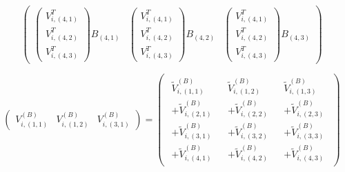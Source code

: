 $$\begin{pmatrix}
		\begin{pmatrix} V_{i,(4,1)}^T \\ V_{i,(4,2)}^T \\ V_{i,(4,3)}^T \end{pmatrix} B_{(4,1)} & \begin{pmatrix} V_{i,(4,1)}^T \\ V_{i,(4,2)}^T \\ V_{i,(4,3)}^T \end{pmatrix} B_{(4,2)} & \begin{pmatrix} V_{i,(4,1)}^T \\ V_{i,(4,2)}^T \\ V_{i,(4,3)}^T \end{pmatrix} B_{(4,3)}
	\end{pmatrix}
$$

$$
	\begin{pmatrix}
		V_{i,(1,1)}^{(B)} & V_{i,(1,2)}^{(B)} & V_{i,(3,1)}^{(B)}
	\end{pmatrix}
	=
	\begin{pmatrix}
		\begin{array}{c} \widetilde{V}_{i,(1,1)}^{(B)} \\ + \widetilde{V}_{i,(2,1)}^{(B)} \\ + \widetilde{V}_{i,(3,1)}^{(B)} \\ + \widetilde{V}_{i,(4,1)}^{(B)} \end{array} & \begin{array}{c} \widetilde{V}_{i,(1,2)}^{(B)} \\ + \widetilde{V}_{i,(2,2)}^{(B)} \\ + \widetilde{V}_{i,(3,2)}^{(B)} \\ + \widetilde{V}_{i,(4,2)}^{(B)} \end{array} & \begin{array}{c} \widetilde{V}_{i,(1,3)}^{(B)} \\ + \widetilde{V}_{i,(2,3)}^{(B)} \\ + \widetilde{V}_{i,(3,3)}^{(B)} \\ + \widetilde{V}_{i,(4,3)}^{(B)} \end{array} 
	\end{pmatrix}
$$

